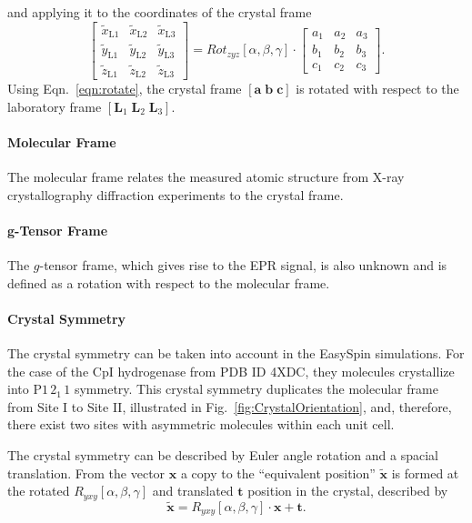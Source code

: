 and applying it to the coordinates of the crystal frame
\begin{equation}
 \begin{bmatrix}
  \tilde{x}_\text{L1} & \tilde{x}_\text{L2} & \tilde{x}_\text{L3} \\
  \tilde{y}_\text{L1} & \tilde{y}_\text{L2} & \tilde{y}_\text{L3} \\
  \tilde{z}_\text{L1} & \tilde{z}_\text{L2} & \tilde{z}_\text{L3} 
  \end{bmatrix} = Rot_{zyz}[\alpha, \beta, \gamma] \cdot \begin{bmatrix}
  a_1 & a_2 & a_3 \\
  b_1 & b_2 & b_3 \\
  c_1 & c_2 & c_3 
  \end{bmatrix}\label{eqn:rotate}.
\end{equation}
Using Eqn.~\ref{eqn:rotate}, the crystal frame $[\mathbf{a}\; \mathbf{b}\; \mathbf{c}]$ is rotated with respect to the laboratory frame $[\mathbf{L}_1\; \mathbf{L}_2\; \mathbf{L}_3]$. 

\paragraph*{Molecular Frame} The molecular frame relates the measured atomic structure from X-ray crystallography diffraction experiments to the crystal frame. 

\paragraph{g-Tensor Frame} The $g$-tensor frame, which gives rise to the EPR signal, is also unknown and is defined as a rotation with respect to the molecular frame.

\paragraph*{Crystal Symmetry} The crystal symmetry can be taken into account in the EasySpin simulations. For the case of the CpI hydrogenase from PDB ID 4XDC, they molecules crystallize into P$1\,2_1\,1$ symmetry. This crystal symmetry duplicates the molecular frame from Site I to Site II, illustrated in Fig.~\ref{fig:CrystalOrientation}, and, therefore, there exist two sites with asymmetric molecules within each unit cell.

The crystal symmetry can be described by Euler angle rotation and a spacial translation. \cite{hovmoller1981rotation} From the vector $\mathbf{x}$ a copy to the ``equivalent position'' $\mathbf{\tilde{x}}$ is formed at the rotated $R_{yxy}[\alpha,\beta,\gamma]$ and translated $\mathbf{t}$ position in the crystal, described by
\begin{equation}
\mathbf{\tilde{x}} = R_{yxy}[\alpha,\beta,\gamma] \cdot \mathbf{x} + \mathbf{t}.
\end{equation}


